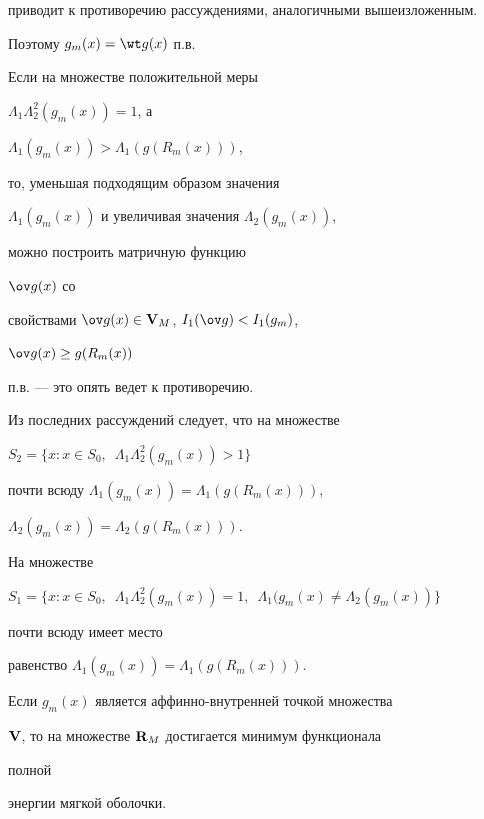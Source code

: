 \begin{pf}
приводит к противоречию рассуждениями, аналогичными вышеизложенным.


Поэтому $g_m(x)=\wt g(x)$ п.в.





Если на множестве положительной меры


$\Lambda_1\Lambda^2_2(g_m(x))=1$, а


$\Lambda_1(g_m(x))>\Lambda_1(g(R_m(x)))$,


то, уменьшая подходящим образом значения


$\Lambda_1(g_m(x))$ и увеличивая значения $\Lambda_2(g_m(x))$,


можно построить матричную функцию


$\ov g(x)$ со


свойствами $\ov g(x)\in\bold V_M$, $I_1(\ov g)<I_1(g_m)$,


$\ov g(x)\ge g(R_m(x))$


п.в. --- это опять ведет к противоречию.





Из последних рассуждений следует, что на множестве


$S_2=\{x:x\in S_0,\ \;\Lambda_1\Lambda^2_2(g_m(x))>1\}$


почти всюду $\Lambda_1(g_m(x))=\Lambda_1(g(R_m(x)))$,


$\Lambda_2(g_m(x))=\Lambda_2(g(R_m(x)))$.


На множестве


$S_1=\{x:x\in S_0,\ \;\Lambda_1\Lambda^2_2(g_m(x))=1,\ \;


\Lambda_1(g_m(x)\ne\Lambda_2(g_m(x))\}$


почти всюду имеет место


равенство $\Lambda_1(g_m(x))=\Lambda_1(g(R_m(x)))$.


\end{pf}





\begin{cornonum}


Если $g_m(x)$ является аффинно-внутренней точкой множества


$\bold V$, то на множестве $\bold R_M$ достигается минимум функционала


полной


энергии мягкой оболочки.


\end{cornonum}





